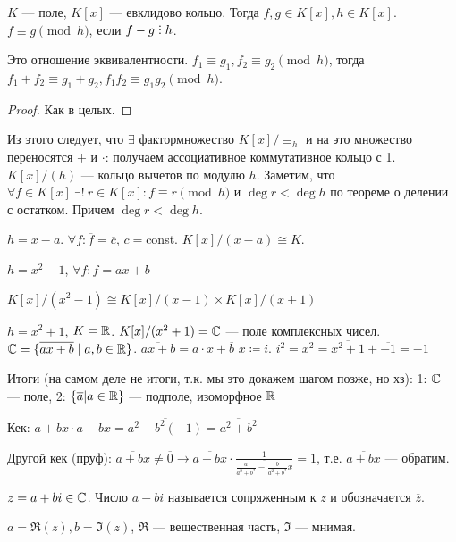 $K$ --- поле, $K[x]$ --- евклидово кольцо. Тогда $f, g \in K[x], h \in K[x]$.  $f \equiv g \pmod{h}$, если  $f - g \divby h$.

 \begin{statement}
    Это отношение эквивалентности. $f_1 \equiv g_1, f_2 \equiv g_2 \pmod h$, тогда $f_1 + f_2 \equiv g_1 + g_2, f_1f_2\equiv g_1g_2 \pmod h$.
\end{statement}
\begin{proof}
    Как в целых.
\end{proof}

Из этого следует, что $\exists$ фактормножество  $K[x]/ \equiv_h$ и на это множество переносятся  $+$ и  $\cdot$: получаем ассоциативное коммутативное кольцо с 1.  $K[x] / (h)$ --- кольцо вычетов по модулю $h$. Заметим, что  $\forall f \in K[x]\  \exists! \ r \in K[x]\!: f \equiv r \pmod h$ и  $\deg r < \deg h$ по теореме о делении с остатком. Причем $\deg r < \deg h$.
 \begin{example}
     $h = x - a$.  $\forall f\!: \overline{f} = \overline{c}$,  $c=$const.  $K[x] / (x - a) \cong K$.
\end{example}
 \begin{example}
     $h = x^2 - 1$,  $\forall f\!: \overline{f} = \overline{ax + b}$

     $K[x] / (x^2-1) \cong K[x] / (x-1) \times K[x] / (x+1)$
 \end{example}

 \begin{example}
     $h = x^2 + 1$,  $K = \mathbb{R}$.  $K[x] / (x^2+1) = \mathbb{C}$ --- поле комплексных чисел.  $\mathbb{C} = \{ \overline{ax + b} \mid a, b \in \mathbb{R}\}$.  $\overline{ax + b} = \overline{a} \cdot \overline{x} + \overline{b}$  $\overline{x} \coloneqq i$.  $i^2 = \overline{x}^2 = \overline{x^2+1} + \overline{-1} = -1$
 \end{example}

 Итоги (на самом деле не итоги, т.к. мы это докажем шагом позже, но хз): 1: $\mathbb{C}$ --- поле, 2: $\{ \overline{a} | a \in \mathbb{R} \}$ --- подполе, изоморфное $\mathbb{R}$

 Кек: $\overline{a + bx} \cdot \overline{a - bx} = \overline{a^2 - b^2(-1)} = \overline{a^2+b^2}$

 Другой кек (пруф): $\overline{a + bx} \neq \overline{0} \to \overline{a + bx} \cdot \frac1{\overline{\frac{a}{a^2 + b^2} - \frac{b}{a^2 + b^2}x}} = 1$, т.е. $\overline{a + bx}$ --- обратим.

 \begin{definition}
     
     $z = a + bi \in \mathbb{C}$. Число $a - bi$ называется сопряженным к $z$ и обозначается $\overline{z}$. 
 \end{definition}
 \begin{definition}
     $a = \Re(z), b = \Im(z)$, $\Re$ --- вещественная часть,  $\Im$ --- мнимая. 
 \end{definition}

